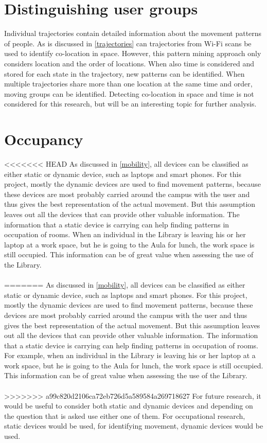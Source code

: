 \section{Distinguishing user groups}\label{dist_usergroups}
Individual trajectories contain detailed information about the movement patterns of people. As is discussed in \autoref{trajectories} can trajectories from Wi-Fi scans be used to identify co-location in space. However, this pattern mining approach only considers location and the order of locations. When also time is considered and stored for each state in the trajectory, new patterns can be identified. When multiple trajectories share more than one location at the same time and order, moving groups can be identified. Detecting co-location in space and time is not considered for this research, but will be an interesting topic for further analysis.

\section{Occupancy}
<<<<<<< HEAD
As discussed in \autoref{mobility}, all devices can be classified as either static or dynamic device, such as laptops and smart phones. For this project, mostly the dynamic devices are used to find movement patterns, because these devices are most probably carried around the campus with the user and thus gives the best representation of the actual movement. But this assumption leaves out all the devices that can provide other valuable information. The information that a static device is carrying can help finding patterns in occupation of rooms. When an individual in the Library is leaving his or her laptop at a work space, but he is going to the Aula for lunch, the work space is still occupied. This information can be of great value when assessing the use of the Library. \\\\
=======
As discussed in \autoref{mobility}, all devices can be classified as either static or dynamic device, such as laptops and smart phones. For this project, mostly the dynamic devices are used to find movement patterns, because these devices are most probably carried around the campus with the user and thus gives the best representation of the actual movement. But this assumption leaves out all the devices that can provide other valuable information. The information that a static device is carrying can help finding patterns in occupation of rooms. For example, when an individual in the Library is leaving his or her laptop at a work space, but he is going to the Aula for lunch, the work space is still occupied. This information can be of great value when assessing the use of the Library. 
\\\\
>>>>>>> a99c820d2106ca72eb726d5a589584a269718627
For future research, it would be useful to consider both static and dynamic devices and depending on the question that is asked use either one of them. For occupational research, static devices would be used, for identifying movement, dynamic devices would be used.

